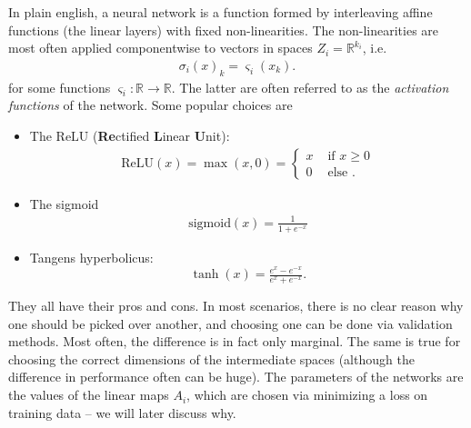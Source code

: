 \documentclass{article}
\newcommand{\R}{\mathbb{R}}
\newcommand{\ReLU}{\mathrm{ReLU}}
\newcommand{\sigmoid}{\mathrm{sigmoid}}
\begin{document}
In plain english, a neural network is a function formed by interleaving affine functions (the linear layers) with fixed non-linearities. The non-linearities are most often applied componentwise to vectors in spaces $Z_i= \R^{k_i}$, i.e.
\begin{align*}
    \sigma_i(x)_k = \varsigma_i(x_k).
\end{align*}
for some functions $\varsigma_i: \R \to \R$. The latter are often referred to as the \emph{activation functions} of the network. Some popular choices are
\begin{itemize}
    \item The $\ReLU$ (\textbf{Re}ctified \textbf{L}inear \textbf{U}nit): 
    \begin{align*}
        \ReLU(x) = \max(x,0) = \begin{cases}
            x & \text{ if } x\geq 0 \\
            0 & \text{ else }.
        \end{cases}
    \end{align*}
    \item The sigmoid
    \begin{align*}
        \sigmoid(x) = \frac{1}{1+e^{-x}}
    \end{align*}
    \item Tangens hyperbolicus:
    $$\tanh(x) = \tfrac{e^{x}-e^{-x}}{e^x+e^{-x}}.$$
\end{itemize}
They all have their pros and cons. In most scenarios, there is no clear reason why one should be picked over another, and choosing one can be done via validation methods. Most often, the difference is in fact only marginal. The same is true for choosing the correct dimensions of the intermediate spaces (although the difference in performance often can be huge). The parameters of the networks are the values of the linear maps $A_i$, which are chosen via minimizing a loss on training data -- we will later discuss why. \newline
\end{document}

